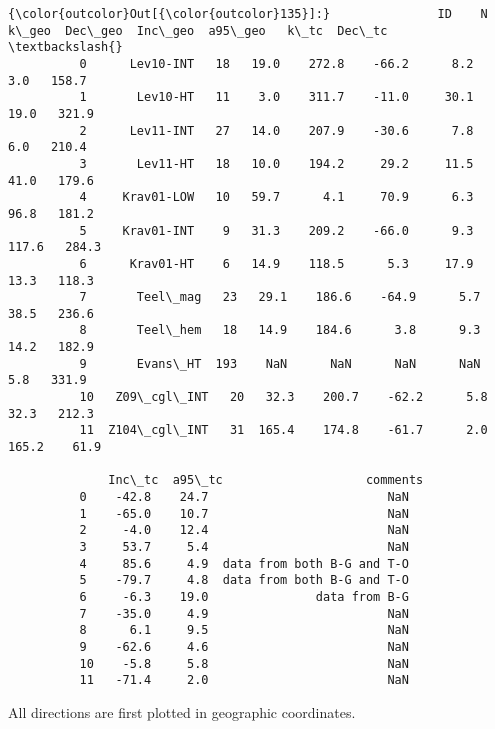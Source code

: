 \documentclass[11pt]{article}
\begin{document}
            \begin{Verbatim}[commandchars=\\\{\}]
{\color{outcolor}Out[{\color{outcolor}135}]:}               ID    N  k\_geo  Dec\_geo  Inc\_geo  a95\_geo   k\_tc  Dec\_tc  \textbackslash{}
          0      Lev10-INT   18   19.0    272.8    -66.2      8.2    3.0   158.7   
          1       Lev10-HT   11    3.0    311.7    -11.0     30.1   19.0   321.9   
          2      Lev11-INT   27   14.0    207.9    -30.6      7.8    6.0   210.4   
          3       Lev11-HT   18   10.0    194.2     29.2     11.5   41.0   179.6   
          4     Krav01-LOW   10   59.7      4.1     70.9      6.3   96.8   181.2   
          5     Krav01-INT    9   31.3    209.2    -66.0      9.3  117.6   284.3   
          6      Krav01-HT    6   14.9    118.5      5.3     17.9   13.3   118.3   
          7       Teel\_mag   23   29.1    186.6    -64.9      5.7   38.5   236.6   
          8       Teel\_hem   18   14.9    184.6      3.8      9.3   14.2   182.9   
          9       Evans\_HT  193    NaN      NaN      NaN      NaN    5.8   331.9   
          10   Z09\_cgl\_INT   20   32.3    200.7    -62.2      5.8   32.3   212.3   
          11  Z104\_cgl\_INT   31  165.4    174.8    -61.7      2.0  165.2    61.9   
          
              Inc\_tc  a95\_tc                    comments  
          0    -42.8    24.7                         NaN  
          1    -65.0    10.7                         NaN  
          2     -4.0    12.4                         NaN  
          3     53.7     5.4                         NaN  
          4     85.6     4.9  data from both B-G and T-O  
          5    -79.7     4.8  data from both B-G and T-O  
          6     -6.3    19.0               data from B-G  
          7    -35.0     4.9                         NaN  
          8      6.1     9.5                         NaN  
          9    -62.6     4.6                         NaN  
          10    -5.8     5.8                         NaN  
          11   -71.4     2.0                         NaN  
\end{Verbatim}
        
    All directions are first plotted in geographic coordinates.


    \begin{center}
    \end{center}
    { \hspace*{\fill} \\}
    
\end{document}
